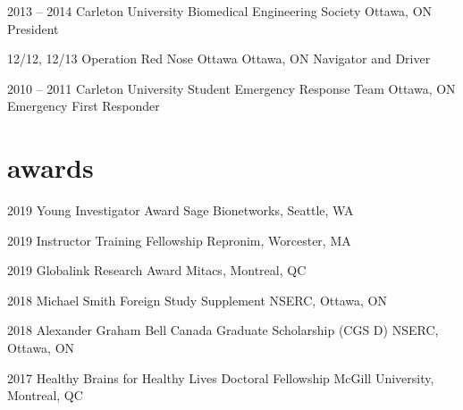 \documentclass[]{friggeri-cv} %
\begin{document}
\begin{entrylist}
\begin{entrylist}
\entry
{2013 -- 2014}
{Carleton University Biomedical Engineering Society}
{Ottawa, ON}
{President}

\entry
{12/12, 12/13}
{Operation Red Nose Ottawa}
{Ottawa, ON}
{Navigator and Driver}

\entry
{2010 -- 2011}
{Carleton University Student Emergency Response Team}
{Ottawa, ON}
{Emergency First Responder}
\end{entrylist}


\section{awards}

\begin{entrylist}
\vspace{-7pt}

\entry
{2019}
{Young Investigator Award}
{Sage Bionetworks, Seattle, WA}
{}
\vspace{-7pt}

\entry
{2019}
{Instructor Training Fellowship}
{Repronim, Worcester, MA}
{}
\vspace{-7pt}

\entry
{2019}
{Globalink Research Award}
{Mitacs, Montreal, QC}
{}
\vspace{-7pt}

\entry
{2018}
{Michael Smith Foreign Study Supplement}
{NSERC, Ottawa, ON}
{}
\vspace{-7pt}

\entry
{2018}
{Alexander Graham Bell Canada Graduate Scholarship (CGS D)}
{NSERC, Ottawa, ON}
{}
\vspace{-7pt}
\end{entrylist}

\begin{entrylist}
\vspace{-7pt}

\entry
{2017}
{Healthy Brains for Healthy Lives Doctoral Fellowship}
{McGill University, Montreal, QC}
{}
\vspace{-7pt}


\end{entrylist}
\end{entrylist}
\end{document}
